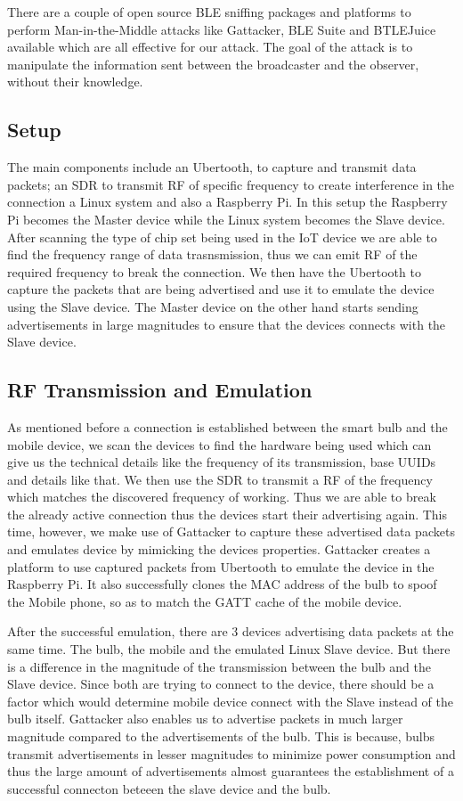 \documentclass[conference]{IEEEtran}
\begin{document}
There are a couple of open source BLE sniffing packages and platforms to perform Man-in-the-Middle attacks like Gattacker, BLE Suite and BTLEJuice available which are all effective for our attack. The goal of the attack is to manipulate the information sent between the broadcaster and the observer, without their knowledge.

\subsection{Setup}
The main components include an Ubertooth, to capture and transmit data packets; an SDR to transmit RF of specific frequency to create interference in the connection a Linux system and also a Raspberry Pi. In this setup the Raspberry Pi becomes the Master device while the Linux system becomes the Slave device. After scanning the type of chip set being used in the IoT device we are able to find the frequency range of data trasnsmission, thus we can emit RF of the required frequency to break the connection. We then have the Ubertooth to capture the packets that are being advertised and use it to emulate the device using the Slave device. The Master device on the other hand starts sending advertisements in large magnitudes to ensure that the devices connects with the Slave device. 

\subsection{RF Transmission and Emulation}
As mentioned before a connection is established between the smart bulb and the mobile device, we scan the devices to find the hardware being used which can give us the technical details like the frequency of its transmission, base UUIDs and details like that. We then use the SDR to transmit a RF of the frequency which matches the discovered frequency of working. Thus we are able to break the already active connection thus the devices start their advertising again. This time, however, we make use of Gattacker to capture these advertised data packets and emulates device by mimicking the devices properties. Gattacker creates a platform to use captured packets from Ubertooth to emulate the device in the Raspberry Pi. It also successfully clones the MAC address of the bulb to spoof the Mobile phone, so as to match the GATT cache of the mobile device.

After the successful emulation, there are 3 devices advertising data packets at the same time. The bulb, the mobile and the emulated Linux Slave device. But there is a difference in the magnitude of the transmission between the bulb and the Slave device. Since both are trying to connect to the device, there should be a factor which would determine mobile device connect with the Slave instead of the bulb itself. Gattacker also enables us to advertise packets in much larger magnitude compared to the advertisements of the bulb. This is because, bulbs transmit advertisements in lesser magnitudes to minimize power consumption and thus the large amount of advertisements almost guarantees the establishment of a successful connecton beteeen the slave device and the bulb.
\end{document}
